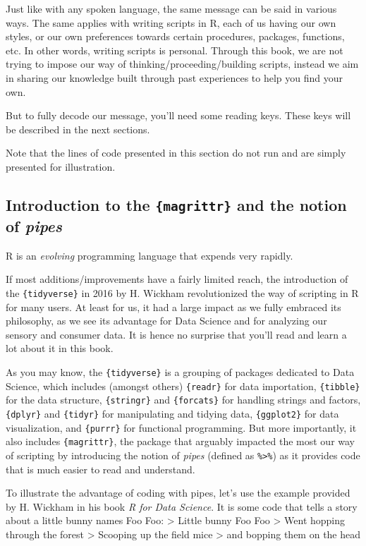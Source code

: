 \documentclass[
]{krantz}
\begin{document}
Just like with any spoken language, the same message can be said in various ways. The same applies with writing scripts in R, each of us having our own styles, or our own preferences towards certain procedures, packages, functions, etc. In other words, writing scripts is personal. Through this book, we are not trying to impose our way of thinking/proceeding/building scripts, instead we aim in sharing our knowledge built through past experiences to help you find your own.

But to fully decode our message, you'll need some reading keys. These keys will be described in the next sections.

Note that the lines of code presented in this section do not run and are simply presented for illustration.

\hypertarget{pipes}{%
\subsection{\texorpdfstring{Introduction to the \texttt{\{magrittr\}} and the notion of \emph{pipes}}{Introduction to the \{magrittr\} and the notion of pipes}}\label{pipes}}

R is an \emph{evolving} programming language that expends very rapidly.

If most additions/improvements have a fairly limited reach, the introduction of the \texttt{\{tidyverse\}} in 2016 by H. Wickham revolutionized the way of scripting in R for many users. At least for us, it had a large impact as we fully embraced its philosophy, as we see its advantage for Data Science and for analyzing our sensory and consumer data. It is hence no surprise that you'll read and learn a lot about it in this book.

As you may know, the \texttt{\{tidyverse\}} is a grouping of packages dedicated to Data Science, which includes (amongst others) \texttt{\{readr\}} for data importation, \texttt{\{tibble\}} for the data structure, \texttt{\{stringr\}} and \texttt{\{forcats\}} for handling strings and factors, \texttt{\{dplyr\}} and \texttt{\{tidyr\}} for manipulating and tidying data, \texttt{\{ggplot2\}} for data visualization, and \texttt{\{purrr\}} for functional programming. But more importantly, it also includes \texttt{\{magrittr\}}, the package that arguably impacted the most our way of scripting by introducing the notion of \emph{pipes} (defined as \texttt{\%\textgreater{}\%}) as it provides code that is much easier to read and understand.

To illustrate the advantage of coding with pipes, let's use the example provided by H. Wickham in his book \emph{R for Data Science}.
It is some code that tells a story about a little bunny names Foo Foo:
\textgreater{} Little bunny Foo Foo
\textgreater{} Went hopping through the forest
\textgreater{} Scooping up the field mice
\textgreater{} and bopping them on the head
\end{document}
